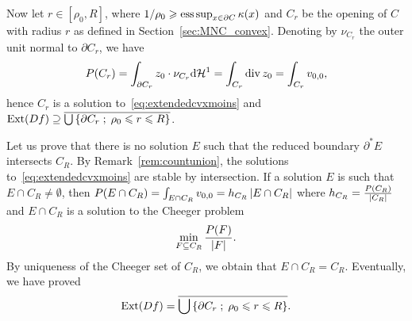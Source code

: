 Now let $r\in [\rho_0, R]$, where $1/\rho_0\geqslant \operatorname{ess}\sup_{x\in\partial C}\kappa(x)$ and $C_r$ be the opening of $C$ with radius $r$ as defined  in Section~\ref{sec:MNC_convex}. Denoting by $\nu_{C_r}$ the outer unit normal to $\partial C_r$, we have
\begin{equation*}
  P(C_r)=\int_{\partial C_r}z_0\cdot \nu_{C_r}\mathrm{d} \mathcal{H}^1 =\int_{C_r}\operatorname{div} z_0 =\int_{C_r}v_{0,0},
\end{equation*}
hence $C_r$ is a solution to~\eqref{eq:extendedcvxmoins} and  $\operatorname{Ext}(Df) \supseteq \overline{\bigcup\left\{ \partial C_r \;;\; \rho_0\leqslant r\leqslant R \right\}}$.

Let us prove that there is no solution $E$ such that the reduced boundary $\partial^*E$ intersects $C_R$. 
By Remark~\ref{rem:countunion}, the solutions to~\eqref{eq:extendedcvxmoins} are stable by intersection. If a solution $E$ is such that $E\cap C_R\neq \emptyset$, then $P(E\cap C_R)=\int_{E\cap C_R}v_{0,0} = h_{C_R}\left| E\cap C_R \right|$ where $h_{C_R}=\frac{P(C_R)}{\left| C_R \right|}$ and $E\cap C_R$ is a solution to the Cheeger problem
\begin{equation*}
  \min_{F\subseteq C_R} \frac{P(F)}{\left| F \right|}. 
\end{equation*}
By uniqueness of the Cheeger set of $C_R$, we obtain that $E\cap C_R=C_R$.
Eventually, we have proved 
\begin{equation}
  \operatorname{Ext}(Df) =\overline{\bigcup\left\{ \partial C_r \;;\; \rho_0\leqslant r\leqslant R \right\}}.
\end{equation}


